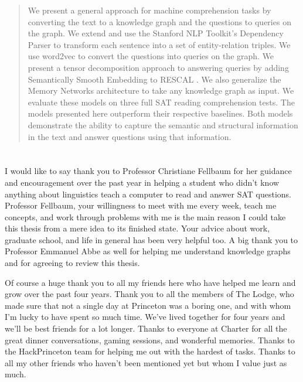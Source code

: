 \documentclass[pageno]{final_paper}
\begin{document}


\begin{abstract}

    \noindent We present a general approach for machine comprehension tasks by
    converting the text to a knowledge graph and the questions to queries on the
    graph. We extend \cite{Narasimhan2015} and use the Stanford NLP Toolkit's
    Dependency Parser \cite{Manning2014, Chen2014} to transform each sentence
    into a set of entity-relation triples. We use word2vec \cite{Mikolov2013} to
    convert the questions into queries on the graph. We present a tensor
    decomposition approach to answering queries by adding Semantically Smooth
    Embedding \cite{Guo2015} to RESCAL \cite{Nickel2011}. We also generalize the
    Memory Networks \cite{Weston2015a, Sukhbaatar2015} architecture to take any
    knowledge graph as input. We evaluate these models on three full SAT reading
    comprehension tests. The models presented here outperform their respective
    baselines. Both models demonstrate the ability to capture the semantic and
    structural information in the text and answer questions using that
    information.

\end{abstract}

\newpage
%
\section*{}
I would like to say thank you to Professor Christiane Fellbaum for her guidance
and encouragement over the past year in helping a student who didn't know
anything about linguistics teach a computer to read and answer SAT questions.
Professor Fellbaum, your willingness to meet with me every week, teach me
concepts, and work through problems with me is the main reason I could take this
thesis from a mere idea to its finished state. Your advice about work, graduate
school, and life in general has been very helpful too. A big thank you to
Professor Emmanuel Abbe as well for helping me understand knowledge graphs and
for agreeing to review this thesis.

Of course a huge thank you to all my friends here who have helped me learn and
grow over the past four years. Thank you to all the members of The Lodge, who
made sure that not a single day at Princeton was a boring one, and with whom I'm
lucky to have spent so much time. We've lived together for four years and we'll
be best friends for a lot longer. Thanks to everyone at Charter for all the
great dinner conversations, gaming sessions, and wonderful memories. Thanks to
the HackPrinceton team for helping me out with the hardest of tasks. Thanks to
all my other friends who haven't been mentioned yet but whom I value just as
much.
\end{document}
